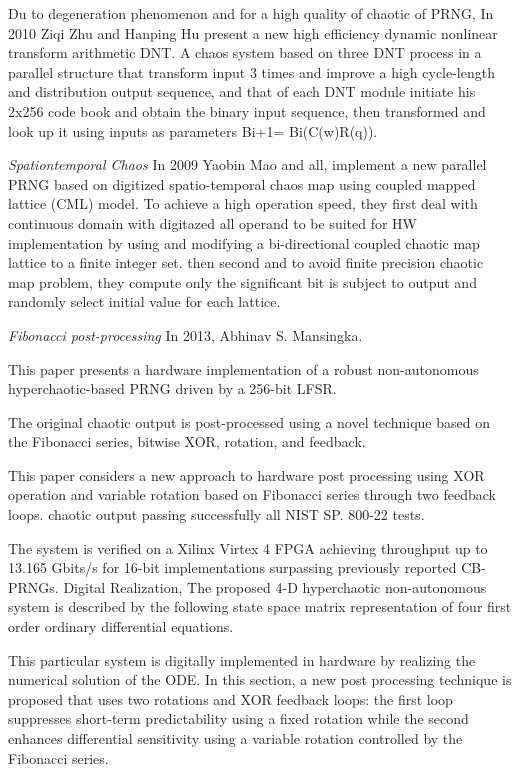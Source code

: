 Du to degeneration phenomenon and for a high quality of chaotic of PRNG, In 2010 Ziqi Zhu and Hanping Hu present a new high efficiency dynamic nonlinear transform arithmetic DNT. A chaos system based on three DNT process in a parallel structure that transform input 3 times and improve a high cycle-length and distribution output sequence, and that of each DNT module initiate his 2x256 code book and obtain the binary input sequence, then transformed and look up it using inputs as parameters Bi+1= Bi(C(w)R(q)). 

\textit{Spationtemporal Chaos} In 2009 Yaobin Mao and all, implement a new parallel PRNG based on digitized spatio-temporal chaos map using  coupled mapped lattice (CML) model. To achieve a high operation speed, they first deal with continuous domain with digitazed all operand to be suited for HW implementation by using and modifying a bi-directional coupled chaotic map lattice to a finite integer set. then second and to avoid finite precision chaotic map problem, they compute only the significant bit is subject to output and randomly select initial value for each lattice.  
 
\textit{Fibonacci post-processing} In 2013, Abhinav S. Mansingka. 

This paper presents a hardware implementation of a robust non-autonomous hyperchaotic-based PRNG driven by a 256-bit LFSR. 

The original chaotic output is post-processed using a novel technique based on the Fibonacci series, bitwise XOR, rotation, and feedback.

 This paper considers a new approach to hardware post processing using XOR operation and variable rotation based on Fibonacci series through two feedback loops. chaotic output passing successfully all NIST SP. 800-22 tests. 
 
 The system is verified on a Xilinx Virtex 4 FPGA achieving throughput up to 13.165 Gbits/s for 16-bit implementations surpassing previously reported CB-PRNGs.  Digital Realization, The proposed 4-D hyperchaotic non-autonomous system is described by the following state space matrix representation of four first order ordinary differential equations. 
 
 This particular system is digitally implemented in hardware by realizing the numerical solution of the ODE. In this section, a new post processing technique is proposed that uses two rotations and XOR feedback loops: the first loop suppresses short-term predictability using a fixed rotation while the second enhances differential sensitivity using a variable rotation controlled by the Fibonacci series.
 
